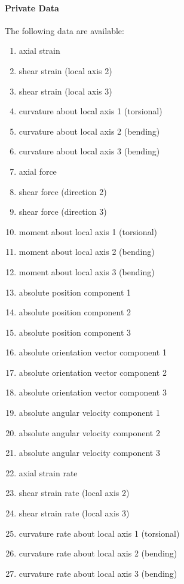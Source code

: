 \paragraph{Private Data}
\label{sec:EL:BEAM:PRIVATE}
The following data are available:
\begin{enumerate}
\item {} axial strain
\item {} shear strain (local axis 2)
\item {} shear strain (local axis 3)
\item {} curvature about local axis 1 (torsional)
\item {} curvature about local axis 2 (bending)
\item {} curvature about local axis 3 (bending)
\item {} axial force
\item {} shear force (direction 2)
\item {} shear force (direction 3)
\item {} moment about local axis 1 (torsional)
\item {} moment about local axis 2 (bending)
\item {} moment about local axis 3 (bending)
\item {} absolute position component 1
\item {} absolute position component 2
\item {} absolute position component 3
\item {} absolute orientation vector component 1
\item {} absolute orientation vector component 2
\item {} absolute orientation vector component 3
\item {} absolute angular velocity component 1
\item {} absolute angular velocity component 2
\item {} absolute angular velocity component 3
\item {} axial strain rate
\item {} shear strain rate (local axis 2)
\item {} shear strain rate (local axis 3)
\item {} curvature rate about local axis 1 (torsional)
\item {} curvature rate about local axis 2 (bending)
\item {} curvature rate about local axis 3 (bending)
\end{enumerate}
